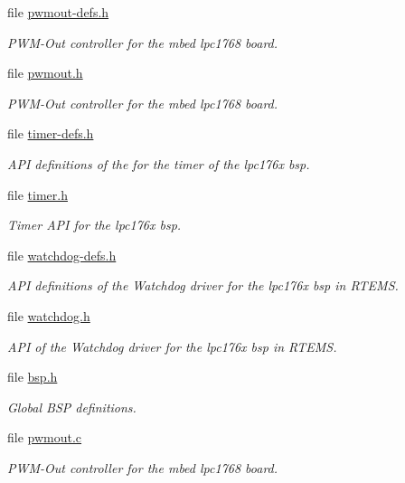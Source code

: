 \begin{DoxyCompactItemize}
file \mbox{\hyperlink{pwmout-defs_8h}{pwmout-\/defs.\+h}}
\begin{DoxyCompactList}\small\item\em P\+W\+M-\/\+Out controller for the mbed lpc1768 board. \end{DoxyCompactList}\item 
file \mbox{\hyperlink{pwmout_8h}{pwmout.\+h}}
\begin{DoxyCompactList}\small\item\em P\+W\+M-\/\+Out controller for the mbed lpc1768 board. \end{DoxyCompactList}\item 
file \mbox{\hyperlink{timer-defs_8h}{timer-\/defs.\+h}}
\begin{DoxyCompactList}\small\item\em A\+PI definitions of the for the timer of the lpc176x bsp. \end{DoxyCompactList}\item 
file \mbox{\hyperlink{bsps_2arm_2lpc176x_2include_2bsp_2timer_8h}{timer.\+h}}
\begin{DoxyCompactList}\small\item\em Timer A\+PI for the lpc176x bsp. \end{DoxyCompactList}\item 
file \mbox{\hyperlink{watchdog-defs_8h}{watchdog-\/defs.\+h}}
\begin{DoxyCompactList}\small\item\em A\+PI definitions of the Watchdog driver for the lpc176x bsp in R\+T\+E\+MS. \end{DoxyCompactList}\item 
file \mbox{\hyperlink{bsps_2arm_2lpc176x_2include_2bsp_2watchdog_8h}{watchdog.\+h}}
\begin{DoxyCompactList}\small\item\em A\+PI of the Watchdog driver for the lpc176x bsp in R\+T\+E\+MS. \end{DoxyCompactList}\item 
file \mbox{\hyperlink{bsps_2arm_2lpc176x_2include_2bsp_8h}{bsp.\+h}}
\begin{DoxyCompactList}\small\item\em Global B\+SP definitions. \end{DoxyCompactList}\item 
file \mbox{\hyperlink{pwmout_8c}{pwmout.\+c}}
\begin{DoxyCompactList}\small\item\em P\+W\+M-\/\+Out controller for the mbed lpc1768 board. \end{DoxyCompactList}\item 

\end{DoxyCompactItemize}
